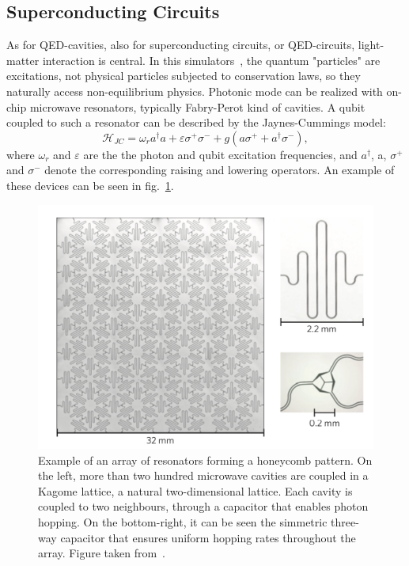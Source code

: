 
\subsection{Superconducting Circuits}
As for QED-cavities, also for superconducting circuits, or QED-circuits, light-matter interaction is central. In this simulators~\cite{supercircuitsQED}, the quantum "particles" are excitations, not physical particles subjected to conservation laws, so they naturally access non-equilibrium physics. Photonic mode can be realized with on-chip microwave resonators, typically Fabry-Perot kind of cavities. A qubit coupled to such a resonator can be described by the Jaynes-Cummings model:
\begin{equation}
    \mathcal{H}_{JC} = \omega_r a^{\dagger}a+ \varepsilon\sigma^+\sigma^- + g(a\sigma^+ + a^{\dagger}\sigma^-),
\end{equation}
where $\omega_r$ and $\varepsilon$ are the the photon and qubit excitation frequencies, and $a^{\dagger}$, a, $\sigma^+$ and $\sigma^-$ denote the corresponding raising and lowering operators. An example of these devices can be seen in fig.~\ref{fig:superconducting_circuits}.

\begin{figure}
    \centering
    \includegraphics[scale=0.6]{Figures/superconducting_circuits.png}
    \caption{Example of an array of resonators forming a honeycomb pattern. On the left, more than two hundred microwave cavities are coupled in a Kagome lattice, a natural two-dimensional lattice. Each cavity is coupled to two neighbours, through a capacitor that enables photon hopping. On the bottom-right, it can be seen the simmetric three-way capacitor that ensures uniform hopping rates throughout the array. Figure taken from~\cite{supercircuitsQED}.}
    \label{fig:superconducting_circuits}
\end{figure}

